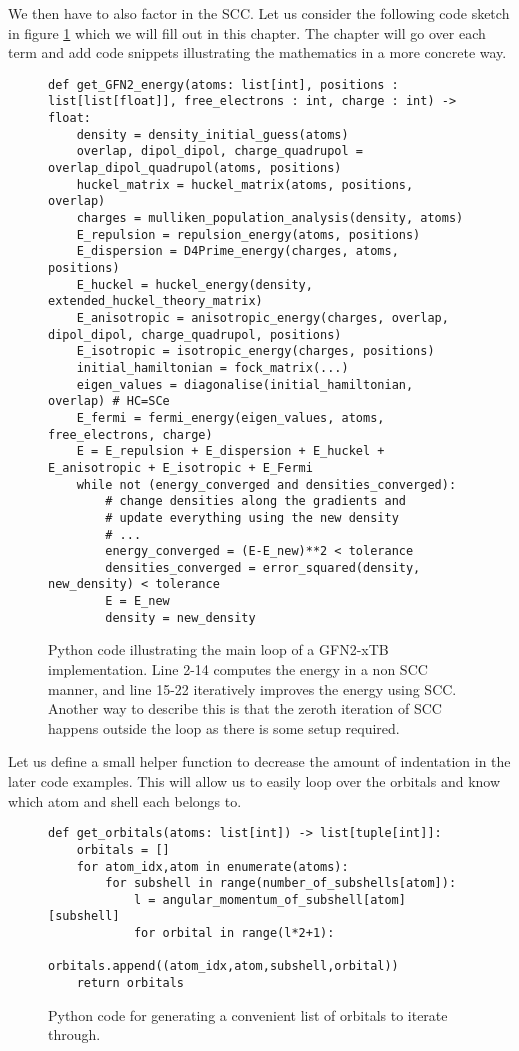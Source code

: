 We then have to also factor in the SCC. 
Let us consider the following code sketch in figure \ref{lst:total_energy} which we will fill out in this chapter. The chapter will go over each term and add code snippets illustrating the mathematics in a more concrete way. 
\begin{figure}[H]
\begin{verbatim}
def get_GFN2_energy(atoms: list[int], positions : list[list[float]], free_electrons : int, charge : int) -> float:
    density = density_initial_guess(atoms)
    overlap, dipol_dipol, charge_quadrupol = overlap_dipol_quadrupol(atoms, positions)
    huckel_matrix = huckel_matrix(atoms, positions, overlap)
    charges = mulliken_population_analysis(density, atoms)
    E_repulsion = repulsion_energy(atoms, positions)
    E_dispersion = D4Prime_energy(charges, atoms, positions)
    E_huckel = huckel_energy(density, extended_huckel_theory_matrix)
    E_anisotropic = anisotropic_energy(charges, overlap, dipol_dipol, charge_quadrupol, positions)
    E_isotropic = isotropic_energy(charges, positions)
    initial_hamiltonian = fock_matrix(...)
    eigen_values = diagonalise(initial_hamiltonian, overlap) # HC=SCe 
    E_fermi = fermi_energy(eigen_values, atoms, free_electrons, charge)
    E = E_repulsion + E_dispersion + E_huckel + E_anisotropic + E_isotropic + E_Fermi
    while not (energy_converged and densities_converged):
        # change densities along the gradients and 
        # update everything using the new density
        # ...
        energy_converged = (E-E_new)**2 < tolerance
        densities_converged = error_squared(density, new_density) < tolerance
        E = E_new
        density = new_density
\end{verbatim}
\caption{Python code illustrating the main loop of a GFN2-xTB implementation.
Line 2-14 computes the energy in a non SCC manner, and line 15-22 iteratively improves the energy using SCC.
Another way to describe this is that the zeroth iteration of SCC happens outside the loop as there is some setup required. 
}
    \label{lst:total_energy}
\end{figure}
Let us define a small helper function to decrease the amount of indentation in the later code examples. This will allow us to easily loop over the orbitals and know which atom and shell each belongs to. 
\begin{figure}[H]
\begin{verbatim}
def get_orbitals(atoms: list[int]) -> list[tuple[int]]:
    orbitals = []
    for atom_idx,atom in enumerate(atoms):
        for subshell in range(number_of_subshells[atom]):
            l = angular_momentum_of_subshell[atom][subshell] 
            for orbital in range(l*2+1):
                orbitals.append((atom_idx,atom,subshell,orbital))
    return orbitals
\end{verbatim}
\caption{Python code for generating a convenient list of orbitals to iterate through.}
\end{figure}

